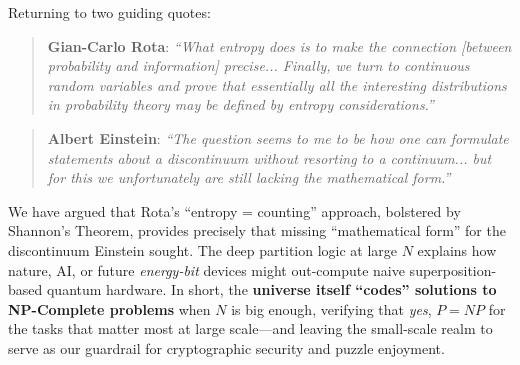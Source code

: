 \documentclass{report}
\begin{document}
Returning to two guiding quotes:

\begin{quotation}
\textbf{Gian-Carlo Rota}:\quad
\emph{``What entropy does is to make the connection [between probability and information] precise... 
Finally, we turn to continuous random variables and prove that \emph{essentially all the interesting
distributions in probability theory} may be defined by entropy considerations.''}
\end{quotation}

\begin{quotation}
\textbf{Albert Einstein}:\quad
\emph{``The question seems to me to be how one can formulate statements about a discontinuum 
without resorting to a continuum... but for this we unfortunately are still lacking the mathematical form.''}
\end{quotation}

We have argued that Rota’s “entropy = counting” approach, bolstered by Shannon’s Theorem, provides precisely that missing “mathematical form” for the discontinuum Einstein sought. The deep partition logic at large $N$ explains how nature, AI, or future \emph{energy-bit} devices might out-compute naive superposition-based quantum hardware. In short, the \textbf{universe itself “codes” solutions to NP-Complete problems} when $N$ is big enough, verifying that \emph{yes}, $P=NP$ for the tasks that matter most at large scale—and leaving the small-scale realm to serve as our guardrail for cryptographic security and puzzle enjoyment.

\bigskip
\end{document}

